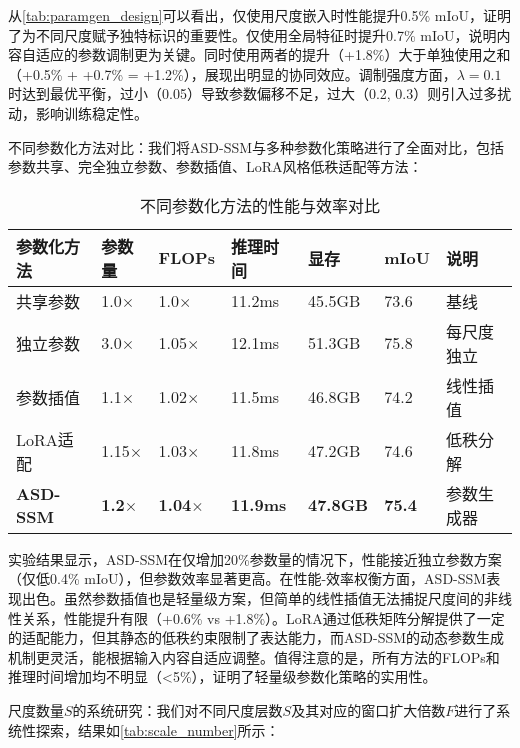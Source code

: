 \documentclass[preprint,12pt]{elsarticle}
\begin{document}
从\cref{tab:paramgen_design}可以看出，仅使用尺度嵌入时性能提升0.5\% mIoU，证明了为不同尺度赋予独特标识的重要性。仅使用全局特征时提升0.7\% mIoU，说明内容自适应的参数调制更为关键。同时使用两者的提升（+1.8\%）大于单独使用之和（+0.5\% + +0.7\% = +1.2\%），展现出明显的协同效应。调制强度方面，$\lambda=0.1$时达到最优平衡，过小（0.05）导致参数偏移不足，过大（0.2, 0.3）则引入过多扰动，影响训练稳定性。

不同参数化方法对比：我们将ASD-SSM与多种参数化策略进行了全面对比，包括参数共享、完全独立参数、参数插值、LoRA风格低秩适配等方法：

\begin{table}[htbp!]
	\centering
	\caption{不同参数化方法的性能与效率对比}
	\label{tab:parameterization_comparison}
	\begin{tabular}{@{}lllllll@{}}
		\toprule
		参数化方法 & 参数量 & FLOPs & 推理时间 & 显存 & mIoU & 说明 \\ 
		\midrule
		共享参数 & 1.0$\times$ & 1.0$\times$ & 11.2ms & 45.5GB & 73.6 & 基线 \\
		\midrule
		独立参数 & 3.0$\times$ & 1.05$\times$ & 12.1ms & 51.3GB & 75.8 & 每尺度独立 \\
		参数插值 & 1.1$\times$ & 1.02$\times$ & 11.5ms & 46.8GB & 74.2 & 线性插值 \\
		LoRA适配 & 1.15$\times$ & 1.03$\times$ & 11.8ms & 47.2GB & 74.6 & 低秩分解 \\
		\textbf{ASD-SSM} & \textbf{1.2$\times$} & \textbf{1.04$\times$} & \textbf{11.9ms} & \textbf{47.8GB} & \textbf{75.4} & 参数生成器 \\
		\bottomrule
	\end{tabular}
\end{table}

实验结果显示，ASD-SSM在仅增加20\%参数量的情况下，性能接近独立参数方案（仅低0.4\% mIoU），但参数效率显著更高。在性能-效率权衡方面，ASD-SSM表现出色。虽然参数插值也是轻量级方案，但简单的线性插值无法捕捉尺度间的非线性关系，性能提升有限（+0.6\% vs +1.8\%）。LoRA通过低秩矩阵分解提供了一定的适配能力，但其静态的低秩约束限制了表达能力，而ASD-SSM的动态参数生成机制更灵活，能根据输入内容自适应调整。值得注意的是，所有方法的FLOPs和推理时间增加均不明显（<5\%），证明了轻量级参数化策略的实用性。

尺度数量$S$的系统研究：我们对不同尺度层数$S$及其对应的窗口扩大倍数$F$进行了系统性探索，结果如\cref{tab:scale_number}所示：
\end{document}
